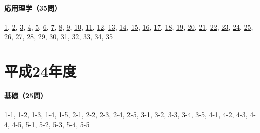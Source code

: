 \paragraph{応用理学（35問）} \hyperref[q:h23-reg-applied-01]{1}, \hyperref[q:h23-reg-applied-02]{2}, \hyperref[q:h23-reg-applied-03]{3}, \hyperref[q:h23-reg-applied-04]{4}, \hyperref[q:h23-reg-applied-05]{5}, \hyperref[q:h23-reg-applied-06]{6}, \hyperref[q:h23-reg-applied-07]{7}, \hyperref[q:h23-reg-applied-08]{8}, \hyperref[q:h23-reg-applied-09]{9}, \hyperref[q:h23-reg-applied-10]{10}, \hyperref[q:h23-reg-applied-11]{11}, \hyperref[q:h23-reg-applied-12]{12}, \hyperref[q:h23-reg-applied-13]{13}, \hyperref[q:h23-reg-applied-14]{14}, \hyperref[q:h23-reg-applied-15]{15}, \hyperref[q:h23-reg-applied-16]{16}, \hyperref[q:h23-reg-applied-17]{17}, \hyperref[q:h23-reg-applied-18]{18}, \hyperref[q:h23-reg-applied-19]{19}, \hyperref[q:h23-reg-applied-20]{20}, \hyperref[q:h23-reg-applied-21]{21}, \hyperref[q:h23-reg-applied-22]{22}, \hyperref[q:h23-reg-applied-23]{23}, \hyperref[q:h23-reg-applied-24]{24}, \hyperref[q:h23-reg-applied-25]{25}, \hyperref[q:h23-reg-applied-26]{26}, \hyperref[q:h23-reg-applied-27]{27}, \hyperref[q:h23-reg-applied-28]{28}, \hyperref[q:h23-reg-applied-29]{29}, \hyperref[q:h23-reg-applied-30]{30}, \hyperref[q:h23-reg-applied-31]{31}, \hyperref[q:h23-reg-applied-32]{32}, \hyperref[q:h23-reg-applied-33]{33}, \hyperref[q:h23-reg-applied-34]{34}, \hyperref[q:h23-reg-applied-35]{35}
\section{平成24年度}
\paragraph{基礎（25問）} \hyperref[q:h24-reg-basic-1-1]{1-1}, \hyperref[q:h24-reg-basic-1-2]{1-2}, \hyperref[q:h24-reg-basic-1-3]{1-3}, \hyperref[q:h24-reg-basic-1-4]{1-4}, \hyperref[q:h24-reg-basic-1-5]{1-5}, \hyperref[q:h24-reg-basic-2-1]{2-1}, \hyperref[q:h24-reg-basic-2-2]{2-2}, \hyperref[q:h24-reg-basic-2-3]{2-3}, \hyperref[q:h24-reg-basic-2-4]{2-4}, \hyperref[q:h24-reg-basic-2-5]{2-5}, \hyperref[q:h24-reg-basic-3-1]{3-1}, \hyperref[q:h24-reg-basic-3-2]{3-2}, \hyperref[q:h24-reg-basic-3-3]{3-3}, \hyperref[q:h24-reg-basic-3-4]{3-4}, \hyperref[q:h24-reg-basic-3-5]{3-5}, \hyperref[q:h24-reg-basic-4-1]{4-1}, \hyperref[q:h24-reg-basic-4-2]{4-2}, \hyperref[q:h24-reg-basic-4-3]{4-3}, \hyperref[q:h24-reg-basic-4-4]{4-4}, \hyperref[q:h24-reg-basic-4-5]{4-5}, \hyperref[q:h24-reg-basic-5-1]{5-1}, \hyperref[q:h24-reg-basic-5-2]{5-2}, \hyperref[q:h24-reg-basic-5-3]{5-3}, \hyperref[q:h24-reg-basic-5-4]{5-4}, \hyperref[q:h24-reg-basic-5-5]{5-5}
